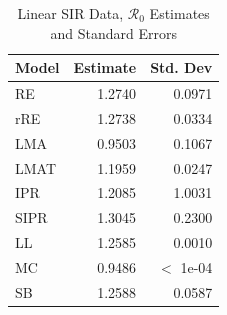 \documentclass[12pt]{article}
\newcommand{\rr}{\ensuremath{\mathcal{R}_0}}
\begin{document}
\begin{table}[H]
	
	\centering
	\begin{tabular}[t]{l|r|r}
		\hline
		Model & Estimate & Std. Dev\\
		\hline
		RE & 1.2740 & 0.0971\\
		\hline
		rRE & 1.2738 & 0.0334\\
		\hline
		LMA & 0.9503 & 0.1067\\
		\hline
		LMAT & 1.1959 & 0.0247\\
		\hline
		IPR & 1.2085 & 1.0031\\
		\hline
		SIPR & 1.3045 & 0.2300\\
		\hline
		LL & 1.2585 & 0.0010\\
		\hline
		MC & 0.9486 & $<$ 1e-04\\
		\hline
		SB & 1.2588 & 0.0587\\
		\hline
	\end{tabular}
	\caption{Linear SIR Data, $\rr$ Estimates and Standard Errors}
\end{table}
\end{document}
